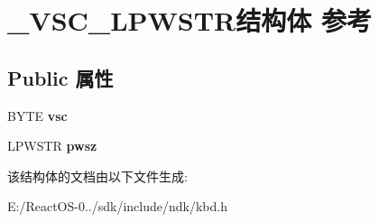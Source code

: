 \hypertarget{struct___v_s_c___l_p_w_s_t_r}{}\section{\+\_\+\+V\+S\+C\+\_\+\+L\+P\+W\+S\+T\+R结构体 参考}
\label{struct___v_s_c___l_p_w_s_t_r}
\subsection*{Public 属性}
\begin{DoxyCompactItemize}
\item 
\mbox{\label{struct___v_s_c___l_p_w_s_t_r_a7c0d0a17fb1c5395298b59bbc63b6654}} 
B\+Y\+TE {\bfseries vsc}
\item 
\mbox{\label{struct___v_s_c___l_p_w_s_t_r_a5acd2d4308a2380ff1d4756e78810b99}} 
L\+P\+W\+S\+TR {\bfseries pwsz}
\end{DoxyCompactItemize}


该结构体的文档由以下文件生成\+:\begin{DoxyCompactItemize}
\item 
E\+:/\+React\+O\+S-\/0../sdk/include/ndk/kbd.\+h\end{DoxyCompactItemize}
